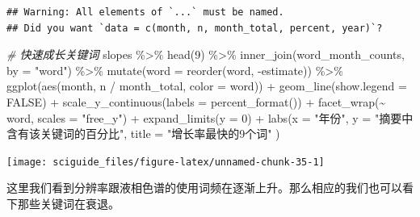 \documentclass[]{tufte-book}
\newenvironment{Shaded}{}{}
\newcommand{\AttributeTok}[1]{\textcolor[rgb]{0.49,0.56,0.16}{#1}}
\newcommand{\CommentTok}[1]{\textcolor[rgb]{0.38,0.63,0.69}{\textit{#1}}}
\newcommand{\ConstantTok}[1]{\textcolor[rgb]{0.53,0.00,0.00}{#1}}
\newcommand{\DecValTok}[1]{\textcolor[rgb]{0.25,0.63,0.44}{#1}}
\newcommand{\FunctionTok}[1]{\textcolor[rgb]{0.02,0.16,0.49}{#1}}
\newcommand{\NormalTok}[1]{#1}
\newcommand{\SpecialCharTok}[1]{\textcolor[rgb]{0.25,0.44,0.63}{#1}}
\newcommand{\StringTok}[1]{\textcolor[rgb]{0.25,0.44,0.63}{#1}}
\begin{document}
\begin{verbatim}
## Warning: All elements of `...` must be named.
## Did you want `data = c(month, n, month_total, percent, year)`?
\end{verbatim}

\begin{Shaded}
\begin{Highlighting}[]
\CommentTok{\# 快速成长关键词}
\NormalTok{slopes }\SpecialCharTok{\%\textgreater{}\%}
  \FunctionTok{head}\NormalTok{(}\DecValTok{9}\NormalTok{) }\SpecialCharTok{\%\textgreater{}\%}
  \FunctionTok{inner\_join}\NormalTok{(word\_month\_counts, }\AttributeTok{by =} \StringTok{"word"}\NormalTok{) }\SpecialCharTok{\%\textgreater{}\%}
  \FunctionTok{mutate}\NormalTok{(}\AttributeTok{word =} \FunctionTok{reorder}\NormalTok{(word, }\SpecialCharTok{{-}}\NormalTok{estimate)) }\SpecialCharTok{\%\textgreater{}\%}
  \FunctionTok{ggplot}\NormalTok{(}\FunctionTok{aes}\NormalTok{(month, n }\SpecialCharTok{/}\NormalTok{ month\_total, }\AttributeTok{color =}\NormalTok{ word)) }\SpecialCharTok{+}
  \FunctionTok{geom\_line}\NormalTok{(}\AttributeTok{show.legend =} \ConstantTok{FALSE}\NormalTok{) }\SpecialCharTok{+}
  \FunctionTok{scale\_y\_continuous}\NormalTok{(}\AttributeTok{labels =} \FunctionTok{percent\_format}\NormalTok{()) }\SpecialCharTok{+}
  \FunctionTok{facet\_wrap}\NormalTok{(}\SpecialCharTok{\textasciitilde{}}\NormalTok{ word, }\AttributeTok{scales =} \StringTok{"free\_y"}\NormalTok{) }\SpecialCharTok{+}
  \FunctionTok{expand\_limits}\NormalTok{(}\AttributeTok{y =} \DecValTok{0}\NormalTok{) }\SpecialCharTok{+}
  \FunctionTok{labs}\NormalTok{(}\AttributeTok{x =} \StringTok{"年份"}\NormalTok{,}
       \AttributeTok{y =} \StringTok{"摘要中含有该关键词的百分比"}\NormalTok{,}
       \AttributeTok{title =} \StringTok{"增长率最快的9个词"}
\NormalTok{              )}
\end{Highlighting}
\end{Shaded}

\texttt{[image: sciguide\_files/figure-latex/unnamed-chunk-35-1]}

这里我们看到分辨率跟液相色谱的使用词频在逐渐上升。那么相应的我们也可以看下那些关键词在衰退。
\end{document}
